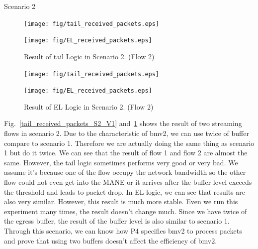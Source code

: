 
\begin{subsection}{Scenario 2}

\begin{figure}[tbh]
	\centering
	\begin{minipage}[t]{0.24\textwidth}
	\centering
	\texttt{[image: fig/tail\_received\_packets.eps]}
	\caption{Result of Tail Logic in Scenario 2. (Flow 1)}
	\label{tail_received_packets_S2_V1} 
	\end{minipage}
	\hfill\begin{minipage}[t]{0.23\textwidth}
	\centering
	\texttt{[image: fig/EL\_received\_packets.eps]}
	\caption{Result of tail Logic in Scenario 2. (Flow 2)}
	\label{tail_received_packets_S2_V2} 
	\end{minipage}
	\vspace{-0.1cm}
\end{figure}

\begin{figure}[tbh]
	\centering
	\begin{minipage}[t]{0.24\textwidth}
	\centering
	\texttt{[image: fig/tail\_received\_packets.eps]}
	\caption{Result of EL Logic in Scenario 2. (Flow 1)}
	\label{el_received_packets_S2_V1} 
	\end{minipage}
	\hfill\begin{minipage}[t]{0.23\textwidth}
	\centering
	\texttt{[image: fig/EL\_received\_packets.eps]}
	\caption{Result of EL Logic in Scenario 2. (Flow 2)}
	\label{EL_received_packets_S2_V2} 
	\end{minipage}
	\vspace{-0.1cm}
\end{figure}


Fig.~\ref{tail_received_packets_S2_V1} and~\ref{tail_received_packets_S2_V2} shows the result of two streaming flows in scenario 2. Due to the characteristic of bmv2, we can use twice of buffer compare to scenario 1. Therefore we are actually doing the same thing as scenario 1 but do it twice. We can see that the result of flow 1 and flow 2 are almost the same. However, the tail logic sometimes performs very good or very bad. We assume it's because one of the flow occupy the network bandwidth so the other flow could not even get into the MANE or it arrives after the buffer level exceeds the threshold and leads to packet drop. In EL logic, we can see that results are also very similar. However, this result is much more stable. Even we run this experiment many times, the result doesn't change much. Since we have twice of the egress buffer, the result of the buffer level is also similar to scenario 1. Through this scenario, we can know how P4 specifies bmv2 to process packets and prove that using two buffers doesn't affect the efficiency of bmv2.

\end{subsection}

